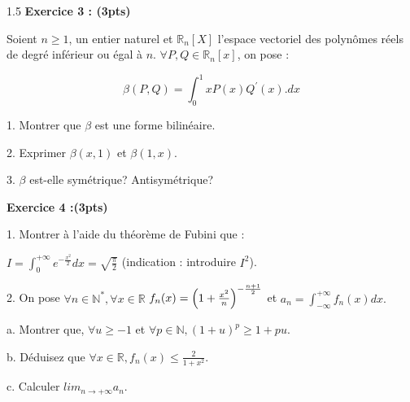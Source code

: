 \documentclass[12pt]{article}
\begin{document}
\begin{spacing}{1.5}
\textbf{Exercice 3 : (3pts)}

Soient $n\geq 1$, un entier naturel et $\mathbb{R}_n[X]$ l'espace vectoriel des polynômes réels de degré inférieur ou égal à $n$. $\forall {P,Q\in \mathbb{R}_n[x]}$, on pose :

\[ \beta(P,Q)=\int_{0}^{1}xP(x)Q^{\prime}(x). dx\]

1. Montrer que $\beta$ est une forme bilinéaire.

2. Exprimer $\beta(x,1)$ et $\beta(1,x)$.

3. $\beta$ est-elle symétrique? Antisymétrique?

\textbf{Exercice 4 :(3pts)}

1. Montrer à l'aide du théorème de Fubini que : 

$I=\int_{0}^{+\infty}e^{-\frac{x^2}{2}}dx=\sqrt{\frac{\pi}{2}}$ (indication : introduire $I^2$).

2. On pose $\forall {n\in \mathbb{N}^*}, \forall {x\in \mathbb{R}}$ $\\
f_n(x)=\left(1+\frac{x^2}{n}\right)^{-\frac{n+1}{2}}$ et $a_n=\int_{-\infty}^{+\infty}f_n(x)dx.$

a. Montrer que, $\forall {u\geq -1}$ et $\forall {p\in \mathbb{N}}, (1+u)^p\geq 1+pu$.

b. Déduisez que $\forall {x\in \mathbb{R}}, f_n(x) \leq \frac{2}{1+x^2}$.

c. Calculer $lim_{n\to +\infty}a_n$.

\end{spacing}
\end{document}

